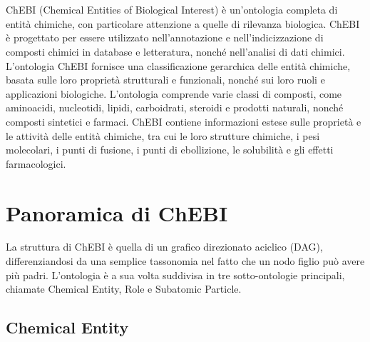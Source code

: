 \documentclass[12pt,a4paper,openright,twoside]{book}
\begin{document}
\frontmatter



\tableofcontents

\mainmatter

\chapter{\introductionname}
\label{chap:introduction}

ChEBI (Chemical Entities of Biological Interest) è un'ontologia completa di entità chimiche, con particolare attenzione a quelle di rilevanza biologica. ChEBI è progettato per essere utilizzato nell'annotazione e nell'indicizzazione di composti chimici in database e letteratura, nonché nell'analisi di dati chimici.
L'ontologia ChEBI fornisce una classificazione gerarchica delle entità chimiche, basata sulle loro proprietà strutturali e funzionali, nonché sui loro ruoli e applicazioni biologiche. L'ontologia comprende varie classi di composti, come aminoacidi, nucleotidi, lipidi, carboidrati, steroidi e prodotti naturali, nonché composti sintetici e farmaci.
ChEBI contiene informazioni estese sulle proprietà e le attività delle entità chimiche, tra cui le loro strutture chimiche, i pesi molecolari, i punti di fusione, i punti di ebollizione, le solubilità e gli effetti farmacologici.

\chapter{Panoramica di ChEBI} %
\label{chap:panoramica}
La struttura di ChEBI è quella di un grafico direzionato aciclico (DAG),
differenziandosi da una semplice tassonomia nel fatto che un nodo figlio può avere più padri.
L'ontologia è a sua volta suddivisa in tre sotto-ontologie principali, chiamate Chemical Entity, Role e Subatomic Particle.

\section{Chemical Entity}
\end{document}

